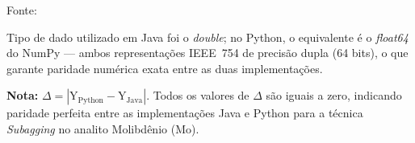 \begin{table}[H]
\begin{threeparttable}
\begin{center}
\begin{minipage}{0.85\linewidth}
\begin{tablenotes}
\footnotesize
\item Fonte:~\oautor
\item[a] Tipo de dado utilizado em Java foi o \textit{double}; no Python,
o equivalente é o \textit{float64} do NumPy — ambos representações IEEE~754
de precisão dupla (64 bits), o que garante paridade numérica exata entre as
duas implementações.
\item \textbf{Nota:} $\Delta = |\text{Y}_{\text{Python}} - \text{Y}_{\text{Java}}|$.
Todos os valores de $\Delta$ são iguais a zero, indicando paridade
perfeita entre as implementações Java e Python para a técnica \textit{Subagging}
no analito Molibdênio (Mo).
\end{tablenotes}
\end{minipage}
\end{center}
\end{threeparttable}
\end{table}

